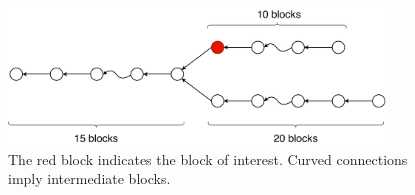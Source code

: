 \begin{figure}[hbt]
    \centering
    \includegraphics[width=10cm]{./images/proofs_25-10+20.pdf}
    \caption{The red block indicates the block of interest. Curved connections
    imply intermediate blocks.}
    \label{figure:proofs_25-10+20}
\end{figure}

